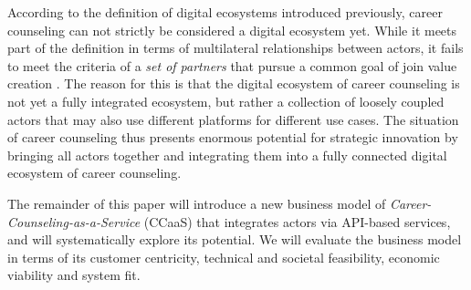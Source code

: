 According to the definition of digital ecosystems introduced previously, career counseling can not strictly be considered
a digital ecosystem yet. While it meets part of the definition in terms of multilateral relationships between actors, it
fails to meet the criteria of a \textit{set of partners} that pursue a common goal of join value creation \citep{adnerEcosystemStructureActionable2017}.
The reason for this is that the digital ecosystem of career counseling is not yet a fully integrated ecosystem, but rather
a collection of loosely coupled actors that may also use different platforms for different use cases. The situation of 
career counseling thus presents enormous potential for strategic innovation by bringing all actors together and integrating
them into a fully connected digital ecosystem of career counseling.

The remainder of this paper will introduce a new business model of \textit{Career-Counseling-as-a-Service} (CCaaS) that
integrates actors via API-based services, and will systematically explore its potential. We will evaluate the business
model in terms of its customer centricity, technical and societal feasibility, economic viability and system fit.